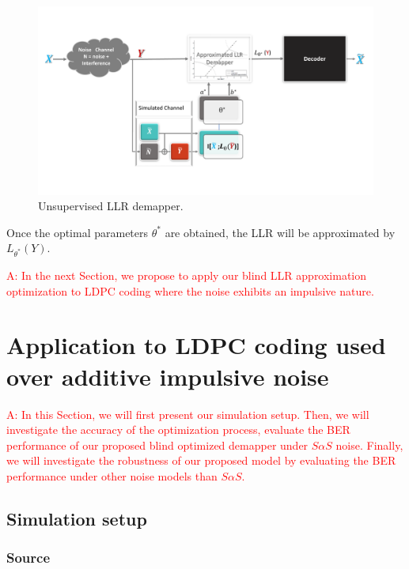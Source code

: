 \documentclass[a4paper]{IEEEtran}
\begin{document}
\begin{figure}
  \centering \includegraphics[width=\linewidth]{fig-5}
  \caption{Unsupervised LLR demapper.}
  \label{fig:5}
\end{figure}

Once the optimal parameters $\theta^*$ are obtained, the LLR
will be approximated by $L_{\theta^*}(Y)$.

\textcolor{red}{A: In the next Section, we propose to apply
  our blind LLR approximation optimization to LDPC coding
  where the noise exhibits an impulsive nature. }




\section{Application to LDPC coding used over additive impulsive noise}
\label{section:ldpc}

\textcolor{red}{A: In this Section, we will first present
  our simulation setup. Then, we will investigate the
  accuracy of the optimization process, evaluate the BER
  performance of our proposed blind optimized demapper under
  $S\alpha S$ noise. Finally, we will investigate the
  robustness of our proposed model by evaluating the BER
  performance under other noise models than $S\alpha S$. }



\subsection{Simulation setup}
\label{subsection:SimuSetup}


\subsubsection{Source}
\end{document}

